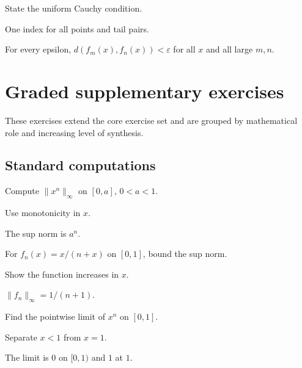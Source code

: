 \begin{exercise}\label{exr:ii11-08}
State the uniform Cauchy condition.
\end{exercise}
\begin{hint}
One index for all points and tail pairs.
\end{hint}
\begin{solution}
For every epsilon, $d(f_m(x),f_n(x))<\varepsilon$ for all $x$ and all large $m,n$.
\end{solution}


\section{Graded supplementary exercises}
These exercises extend the core exercise set and are grouped by mathematical role and increasing level of synthesis.

\subsection*{Standard computations}

\begin{exercise}\label{exr:ii11-expand-01}
Compute \(\|x^n\|_\infty\) on \([0,a]\), \(0<a<1\).
\end{exercise}
\begin{hint}
Use monotonicity in \(x\).
\end{hint}
\begin{solution}
The sup norm is \(a^n\).
\end{solution}

\begin{exercise}\label{exr:ii11-expand-02}
For \(f_n(x)=x/(n+x)\) on \([0,1]\), bound the sup norm.
\end{exercise}
\begin{hint}
Show the function increases in \(x\).
\end{hint}
\begin{solution}
\(\|f_n\|_\infty=1/(n+1)\).
\end{solution}

\begin{exercise}\label{exr:ii11-expand-03}
Find the pointwise limit of \(x^n\) on \([0,1]\).
\end{exercise}
\begin{hint}
Separate \(x<1\) from \(x=1\).
\end{hint}
\begin{solution}
The limit is \(0\) on \([0,1)\) and \(1\) at \(1\).
\end{solution}

